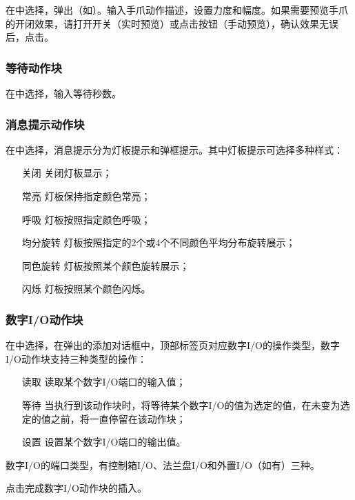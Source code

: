 在中选择，弹出（如）。输入手爪动作描述，设置力度和幅度。如果需要预览手爪的开闭效果，请打开开关（实时预览）或点击按钮（手动预览），确认效果无误后，点击。

\subsubsection{等待动作块}
在中选择，输入等待秒数。
\subsubsection{消息提示动作块}
在中选择，消息提示分为灯板提示和弹框提示。其中灯板提示可选择多种样式：
\begin{itemize}[leftmargin=4.5em]
\item[关闭] 关闭灯板显示；
\item[常亮] 灯板保持指定颜色常亮；
\item[呼吸] 灯板按照指定颜色呼吸；
\item[均分旋转] 灯板按照指定的2个或4个不同颜色平均分布旋转展示；
\item[同色旋转] 灯板按照某个颜色旋转展示；
\item[闪烁] 灯板按照某个颜色闪烁。
\end{itemize}
\subsubsection{数字I/O动作块}
在中选择，在弹出的添加对话框中，顶部标签页对应数字I/O的操作类型，数字I/O动作块支持三种类型的操作：
\begin{itemize}[leftmargin=4.5em]
\item[读取] 读取某个数字I/O端口的输入值；
\item[等待] 当执行到该动作块时，将等待某个数字I/O的值为选定的值，在未变为选定的值之前，将一直停留在该动作块；
\item[设置] 设置某个数字I/O端口的输出值。
\end{itemize}

数字I/O的端口类型，有控制箱I/O、法兰盘I/O和外置I/O（如有）三种。


点击完成数字I/O动作块的插入。

